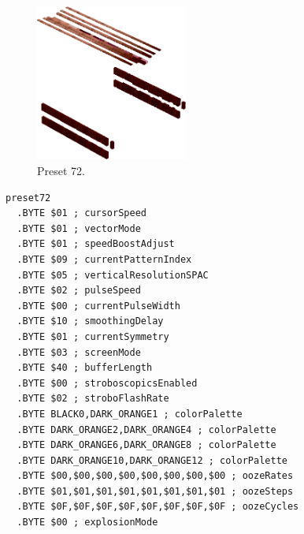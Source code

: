 \clearpage
\begin{minipage}[b]{0.48\linewidth}
\begin{figure}[H]                                                          
  \centering                                                             
  \begin{adjustbox}{width=5cm,center}                                   
  \includegraphics[width=5cm]{src/colorspace_presets/preset72-45.png}%
  \end{adjustbox}                                                        
\caption*{Preset 72.}                                           
\end{figure}                                                               
\end{minipage}
\hspace{0.1cm}
\begin{minipage}[b]{0.48\linewidth}                            
\begin{lstlisting}[basicstyle=\ttfamily\tiny]
preset72
  .BYTE $01 ; cursorSpeed
  .BYTE $01 ; vectorMode
  .BYTE $01 ; speedBoostAdjust
  .BYTE $09 ; currentPatternIndex
  .BYTE $05 ; verticalResolutionSPAC
  .BYTE $02 ; pulseSpeed
  .BYTE $00 ; currentPulseWidth
  .BYTE $10 ; smoothingDelay
  .BYTE $01 ; currentSymmetry
  .BYTE $03 ; screenMode
  .BYTE $40 ; bufferLength
  .BYTE $00 ; stroboscopicsEnabled
  .BYTE $02 ; stroboFlashRate
  .BYTE BLACK0,DARK_ORANGE1 ; colorPalette
  .BYTE DARK_ORANGE2,DARK_ORANGE4 ; colorPalette
  .BYTE DARK_ORANGE6,DARK_ORANGE8 ; colorPalette
  .BYTE DARK_ORANGE10,DARK_ORANGE12 ; colorPalette
  .BYTE $00,$00,$00,$00,$00,$00,$00,$00 ; oozeRates
  .BYTE $01,$01,$01,$01,$01,$01,$01,$01 ; oozeSteps
  .BYTE $0F,$0F,$0F,$0F,$0F,$0F,$0F,$0F ; oozeCycles
  .BYTE $00 ; explosionMode
\end{lstlisting}
\end{minipage}

\vspace*{-0.5cm}

